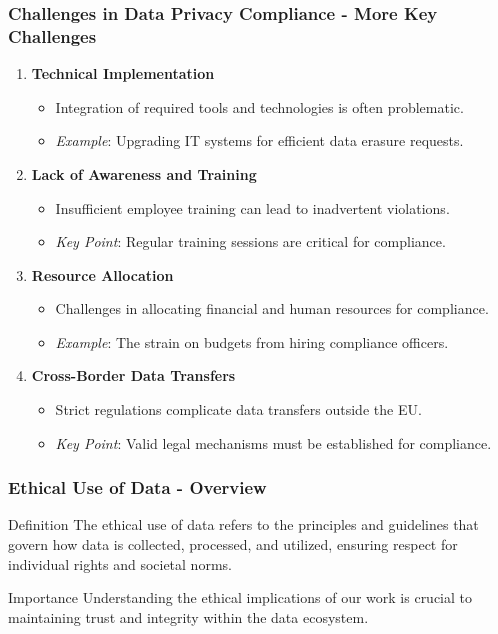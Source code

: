 \documentclass[aspectratio=169]{beamer}
\begin{document}
\begin{frame}[fragile]
    \frametitle{Challenges in Data Privacy Compliance - More Key Challenges}
    \begin{enumerate}[resume]
        \item \textbf{Technical Implementation}
            \begin{itemize}
                \item Integration of required tools and technologies is often problematic.
                \item \textit{Example}: Upgrading IT systems for efficient data erasure requests.
            \end{itemize}
        \item \textbf{Lack of Awareness and Training}
            \begin{itemize}
                \item Insufficient employee training can lead to inadvertent violations.
                \item \textit{Key Point}: Regular training sessions are critical for compliance.
            \end{itemize}
        \item \textbf{Resource Allocation}
            \begin{itemize}
                \item Challenges in allocating financial and human resources for compliance.
                \item \textit{Example}: The strain on budgets from hiring compliance officers.
            \end{itemize}
        \item \textbf{Cross-Border Data Transfers}
            \begin{itemize}
                \item Strict regulations complicate data transfers outside the EU.
                \item \textit{Key Point}: Valid legal mechanisms must be established for compliance.
            \end{itemize}
    \end{enumerate}
\end{frame}

\begin{frame}[fragile]
    \frametitle{Ethical Use of Data - Overview}
    \begin{block}{Definition}
        The ethical use of data refers to the principles and guidelines that govern how data 
        is collected, processed, and utilized, ensuring respect for individual rights and 
        societal norms.
    \end{block}
    \begin{block}{Importance}
        Understanding the ethical implications of our work is crucial to maintaining trust 
        and integrity within the data ecosystem.
    \end{block}
\end{frame}
\end{document}
